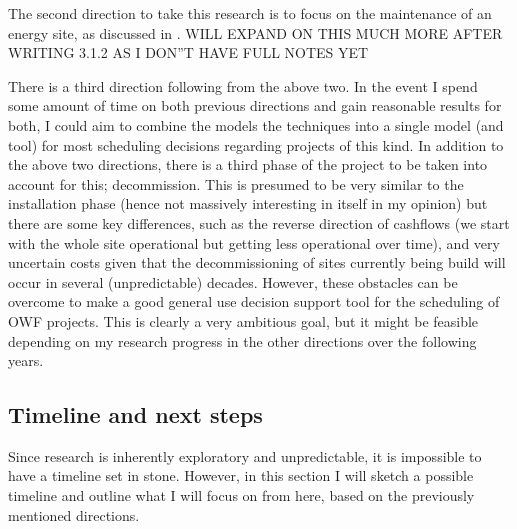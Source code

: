 \documentclass[a4paper,12pt]{article}
\begin{document}
\bigskip

The second direction to take this research is to focus on the maintenance of an energy site, as discussed in . WILL EXPAND ON THIS MUCH MORE AFTER WRITING 3.1.2 AS I DON''T HAVE FULL NOTES YET

\bigskip

There is a third direction following from the above two. In the event I spend some amount of time on both previous directions and gain reasonable results for both, I could aim to combine the models the techniques into a single model (and tool) for most scheduling decisions regarding projects of this kind. In addition to the above two directions, there is a third phase of the project to be taken into account for this; decommission. This is presumed to be very similar to the installation phase (hence not massively interesting in itself in my opinion) but there are some key differences, such as the reverse direction of cashflows (we start with the whole site operational but getting less operational over time), and very uncertain costs given that the decommissioning of sites currently being build will occur in several (unpredictable) decades. However, these obstacles can be overcome to make a good general use decision support tool for the scheduling of OWF projects. This is clearly a very ambitious goal, but it might be feasible depending on my research progress in the other directions over the following years. 

\bigskip

\subsection{Timeline and next steps} \label{ss:timel}
Since research is inherently exploratory and unpredictable, it is impossible to have a timeline set in stone. However, in this section I will sketch a possible timeline and outline what I will focus on from here, based on the previously mentioned directions. 
\end{document}
